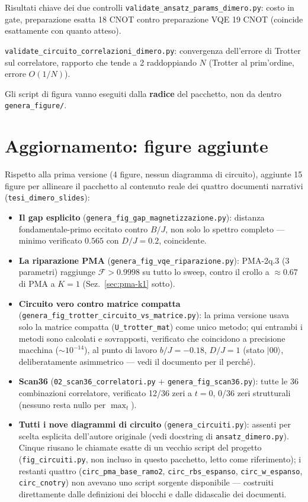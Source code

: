 \documentclass[11pt,a4paper]{article}
\newcommand{\ket}[1]{\lvert #1 \rangle}
\newcommand{\code}[1]{\texttt{\small #1}}
\begin{document}
\begin{okbox}{Risultati chiave dei due controlli}
\code{validate\_ansatz\_params\_dimero.py}: costo in gate, preparazione
esatta 18 CNOT contro preparazione VQE 19 CNOT (coincide esattamente
con quanto atteso).

\code{validate\_circuito\_correlazioni\_dimero.py}: convergenza
dell'errore di Trotter sul correlatore, rapporto che tende a 2
raddoppiando $N$ (Trotter al prim'ordine, errore $O(1/N)$).
\end{okbox}

Gli script di figura vanno eseguiti dalla \textbf{radice} del pacchetto,
non da dentro \code{genera\_figure/}.

\section{Aggiornamento: figure aggiunte}
\label{sec:aggiornamento}

Rispetto alla prima versione (4 figure, nessun diagramma di circuito),
aggiunte 15 figure per allineare il pacchetto al contenuto reale dei
quattro documenti narrativi (\texttt{tesi\_dimero\_slides}):

\begin{itemize}[leftmargin=1.4em,itemsep=3pt]
\item \textbf{Il gap esplicito}
(\code{genera\_fig\_gap\_magnetizzazione.py}): distanza
fondamentale-primo eccitato contro $B/J$, non solo lo spettro completo
--- minimo verificato $0.565$ con $D/J=0.2$, coincidente.
\item \textbf{La riparazione PMA}
(\code{genera\_fig\_vqe\_riparazione.py}): PMA-2q.3 (3 parametri)
raggiunge $\mathcal F>0.9998$ su tutto lo sweep, contro il crollo a
$\approx0.67$ di PMA a $K=1$ (Sez.~\ref{sec:pma-k1} sotto).
\item \textbf{Circuito vero contro matrice compatta}
(\code{genera\_fig\_trotter\_circuito\_vs\_matrice.py}): la prima
versione usava solo la matrice compatta (\code{U\_trotter\_mat}) come
unico metodo; qui entrambi i metodi sono calcolati e sovrapposti,
verificato che coincidono a precisione macchina ($\sim10^{-14}$), al
punto di lavoro $b/J=-0.18$, $D/J=1$ (stato $\ket{00}$, deliberatamente
asimmetrico --- vedi il documento per il perché).
\item \textbf{Scan36} (\code{02\_scan36\_correlatori.py} +
\code{genera\_fig\_scan36.py}): tutte le 36 combinazioni correlatore,
verificato 12/36 zeri a $t=0$, 0/36 zeri strutturali (nessuno resta
nullo per $\max_t$).
\item \textbf{Tutti i nove diagrammi di circuito}
(\code{genera\_circuiti.py}): assenti per scelta esplicita
dell'autore originale (vedi docstring di \code{ansatz\_dimero.py}).
Cinque riusano le chiamate esatte di un vecchio script del progetto
(\texttt{fig\_circuiti.py}, non incluso in questo pacchetto, letto come
riferimento); i restanti quattro (\code{circ\_pma\_base\_ramo2},
\code{circ\_rbs\_espanso}, \code{circ\_w\_espanso}, \code{circ\_cnotry})
non avevano uno script sorgente disponibile --- costruiti direttamente
dalle definizioni dei blocchi e dalle didascalie dei documenti.
\end{itemize}
\end{document}
